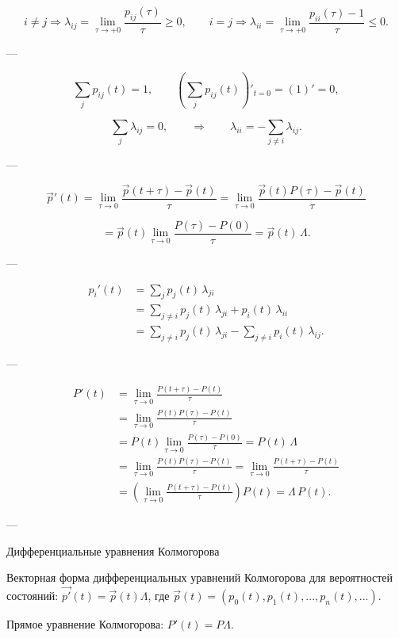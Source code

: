 \[
	i \ne j \Rightarrow
	\lambda_{ij} = \lim_{\tau \to +0}
	\frac{p_{ij}(\tau)}{\tau} \ge 0,
	\qquad
	i = j \Rightarrow
	\lambda_{ii} = \lim_{\tau \to +0}
	\frac{p_{ii}(\tau) - 1}{\tau} \le 0.
\]

---


\[
	\sum_j p_{ij}(t) = 1,
	\qquad
	\left( \sum_j p_{ij}(t) \right)'_{t=0} = (1)' = 0,
\]

\[
	\sum_j \lambda_{ij} = 0,
	\qquad
	\Rightarrow
	\qquad
	\lambda_{ii} = - \sum_{j \ne i} \lambda_{ij}.
\]


---

\[
	\vec{p}'(t)
	= \lim_{\tau \to 0}
	\frac{\vec{p}(t+\tau) - \vec{p}(t)}{\tau}
	=
	\lim_{\tau \to 0}
	\frac{\vec{p}(t){P}(\tau) - \vec{p}(t)}{\tau}
\]

\[
	= \vec{p}(t)
	\lim_{\tau \to 0}
	\frac{P(\tau) - P(0)}{\tau}
	= \vec{p}(t)\,{\Lambda}.
\]

---

\begin{align*}
	p_i'(t)
	 & = \sum_j p_j(t)\,\lambda_{ji}
	\\[4pt]
	 & = \sum_{j \ne i} p_j(t)\,\lambda_{ji} + p_i(t)\,\lambda_{ii}
	\\[4pt]
	 & = \sum_{j \ne i} p_j(t)\,\lambda_{ji} - \sum_{j \ne i} p_i(t)\,\lambda_{ij}.
\end{align*}

---

\begin{align*}
	{P}'(t)
	 & = \lim_{\tau \to 0}
	\frac{{P}(t+\tau) - {P}(t)}{\tau}
	\\[4pt]
	 & = \lim_{\tau \to 0}
	\frac{{P}(t){P}(\tau) - {P}(t)}{\tau}
	\\[4pt]
	 & = {P}(t)
	\lim_{\tau \to 0}
	\frac{{P}(\tau) - {P}(0)}{\tau}
		= {P}(t)\,{\Lambda}
	\\[4pt]
	 & = \lim_{\tau \to 0}
	\frac{{P}(t){P}(\tau) - {P}(t)}{\tau}
	= \lim_{\tau \to 0}
	\frac{{P}(t+\tau) - {P}(t)}{\tau}
	\\[4pt]
	 & =
	\left(
	\lim_{\tau \to 0}
	\frac{{P}(t+\tau) - {P}(t)}{\tau}
	\right)
	{P}(t)
	= {\Lambda}\,{P}(t).
\end{align*}

---


Дифференциальные уравнения Колмогорова

Векторная форма дифференциальных уравнений Колмогорова для вероятностей состояний:
$\vec{p'}(t)=\vec{p}(t)\Lambda$, где $\vec{p}(t)=(p_0(t),p_1(t),...,p_n(t),...)$.

Прямое уравнение Колмогорова: $P'(t)=P\Lambda$.

